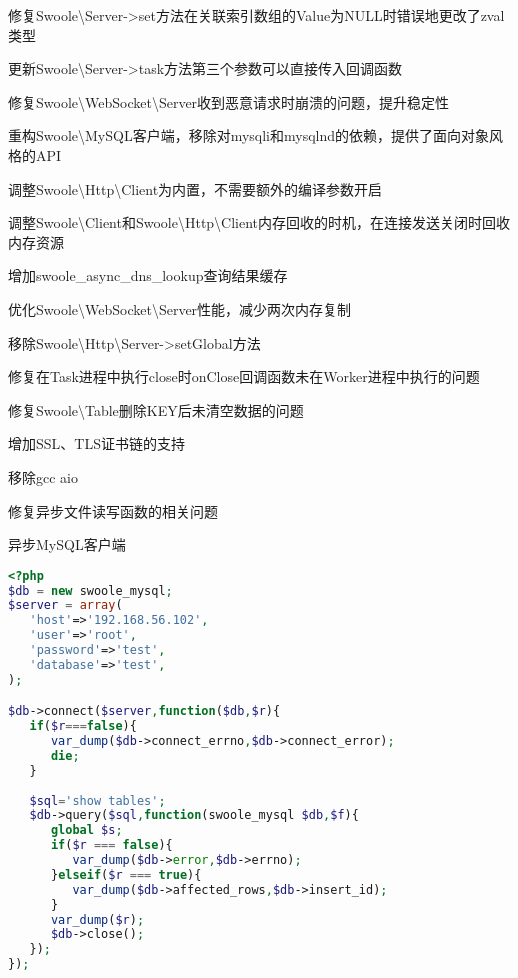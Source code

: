 \begin{compactitem}
\item 修复Swoole\textbackslash Server->set方法在关联索引数组的Value为NULL时错误地更改了zval类型
\item 更新Swoole\textbackslash Server->task方法第三个参数可以直接传入回调函数
\item 修复Swoole\textbackslash WebSocket\textbackslash Server收到恶意请求时崩溃的问题，提升稳定性
\item 重构Swoole\textbackslash MySQL客户端，移除对mysqli和mysqlnd的依赖，提供了面向对象风格的API
\item 调整Swoole\textbackslash Http\textbackslash Client为内置，不需要额外的编译参数开启
\item 调整Swoole\textbackslash Client和Swoole\textbackslash Http\textbackslash Client内存回收的时机，在连接发送关闭时回收内存资源
\item 增加swoole\_async\_dns\_lookup查询结果缓存
\item 优化Swoole\textbackslash WebSocket\textbackslash Server性能，减少两次内存复制
\item 移除Swoole\textbackslash Http\textbackslash Server->setGlobal方法
\item 修复在Task进程中执行close时onClose回调函数未在Worker进程中执行的问题
\item 修复Swoole\textbackslash Table删除KEY后未清空数据的问题
\item 增加SSL、TLS证书链的支持
\item 移除gcc aio
\item 修复异步文件读写函数的相关问题
\end{compactitem}



\begin{example}
异步MySQL客户端
\begin{lstlisting}[language=PHP]
<?php
$db = new swoole_mysql;
$server = array(
   'host'=>'192.168.56.102',
   'user'=>'root',
   'password'=>'test',
   'database'=>'test',
);

$db->connect($server,function($db,$r){
   if($r===false){
      var_dump($db->connect_errno,$db->connect_error);
      die;
   }
   
   $sql='show tables';
   $db->query($sql,function(swoole_mysql $db,$f){
      global $s;
      if($r === false){
         var_dump($db->error,$db->errno);
      }elseif($r === true){
         var_dump($db->affected_rows,$db->insert_id);
      }
      var_dump($r);
      $db->close();
   });
});
\end{lstlisting}
\end{example}



